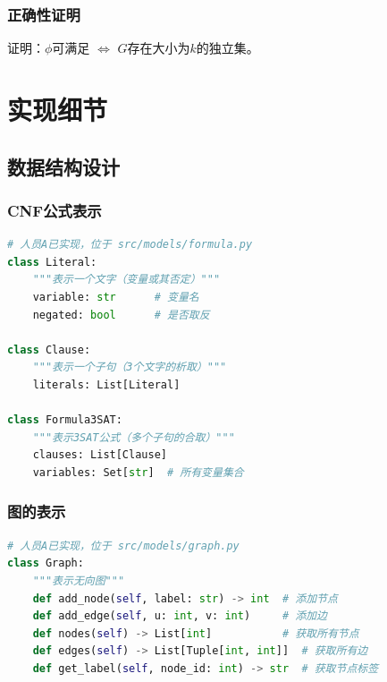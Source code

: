 \documentclass{sysucseexp}
\begin{document}
\subsubsection{正确性证明}

证明：$\phi$可满足 $\Leftrightarrow$ $G$存在大小为$k$的独立集。


\section{实现细节}

\subsection{数据结构设计}

\subsubsection{CNF公式表示}

\begin{lstlisting}[language=Python]
# 人员A已实现，位于 src/models/formula.py
class Literal:
    """表示一个文字（变量或其否定）"""
    variable: str      # 变量名
    negated: bool      # 是否取反

class Clause:
    """表示一个子句（3个文字的析取）"""
    literals: List[Literal]

class Formula3SAT:
    """表示3SAT公式（多个子句的合取）"""
    clauses: List[Clause]
    variables: Set[str]  # 所有变量集合
\end{lstlisting}

\subsubsection{图的表示}

\begin{lstlisting}[language=Python]
# 人员A已实现，位于 src/models/graph.py
class Graph:
    """表示无向图"""
    def add_node(self, label: str) -> int  # 添加节点
    def add_edge(self, u: int, v: int)     # 添加边
    def nodes(self) -> List[int]           # 获取所有节点
    def edges(self) -> List[Tuple[int, int]]  # 获取所有边
    def get_label(self, node_id: int) -> str  # 获取节点标签
\end{lstlisting}
\end{document}

